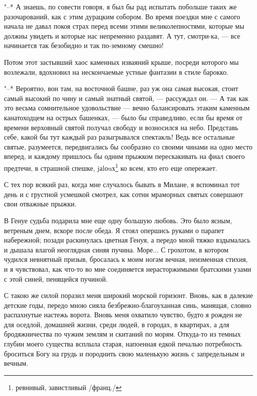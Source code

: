 "--* А знаешь, по совести говоря, я был бы рад испытать побольше таких
же разочарований, как с этим дурацким  собором. Во время поездки мне с
самого начала не давал покоя страх перед всеми этими великолепностями,
которые мы  должны увидеть и  которые нас непременно раздавят.  А тут,
смотри-ка, --- все начинается так безобидно и так по-земному смешно!

Потом этот застывший хаос каменных изваяний крыше, посреди которого мы
возлежали, вдохновил на нескончаемые устные фантазии в стиле барокко.

"--* Вероятно, вон там, на восточной  башне, раз уж она самая высокая,
стоит  самый высокий  по чину  и самый  знатный святой,  --- рассуждал
он.  --- А  так как  это  весьма сомнительное  удовольствие ---  вечно
балансировать  этаким каменным  канатоходцем на  острых башенках,  ---
было бы справедливо, если бы время от времени верховный святой получал
свободу  и возносился  на небо.  Представь себе,  какой бы  тут каждый
раз  разыгрывался спектакль!  Ведь все  остальные святые,  разумеется,
передвигались бы  сообразно со своими  чинами на одно место  вперед, и
каждому  пришлось  бы  одним  прыжком  перескакивать  на  фиал  своего
предтечи,  в  страшной спешке,  jаlоuх\footnote{ревнивый,  завистливый
/франц./} ко всем, кто его еще опережает.

С тех пор всякий раз, когда мне случалось бывать в Милане, я вспоминал
тот день  и с  грустной усмешкой смотрел,  как сотни  мраморных святых
совершают свои отважные прыжки.

В  Генуе  судьба  подарила  мне  еще одну  большую  любовь.  Это  было
ясным, ветреным  днем, вскоре после  обеда. Я стоял опершись  руками о
парапет набережной;  позади раскинулась  цветная Генуя, а  передо мной
тяжко вздымалась  и дышала влагой  неоглядная синяя пучина.  Море... С
грохотом,  в  котором  чудился  невнятный  призыв,  бросалась  к  моим
ногам вечная,  неизменная стихия,  и я чувствовал,  как что-то  во мне
соединяется  нерасторжимыми братскими  узами с  этой синей,  пенящейся
пучиной.

С такою же  силой поразил меня широкий морской горизонт.  Вновь, как в
далекие детские  годы, передо мною сияла  безбрежно-благоуханная синь,
манящая,  словно  распахнутые  настежь  ворота.  Вновь  меня  охватило
чувство, будто я  рожден не для оседлой, домашней  жизни, среди людей,
в  городах,  в квартирах,  а  для  бродяжничества  по чужим  землям  и
скитаний по морям.  Откуда-то из темных глубин  моего существа всплыла
старая, напоенная едкой печалью потребность  броситься Богу на грудь и
породнить свою маленькую жизнь с запредельным и вечным.

